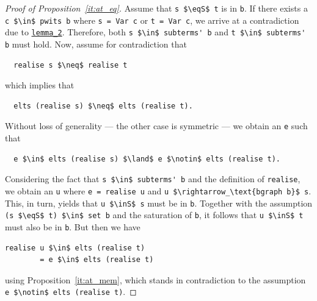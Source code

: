 \documentclass[
  sigplan,
  10pt,
  ]{acmart}
\newcommand{\inS}{\in_\text{s}}
\newcommand{\eqS}{=_\text{s}}
\begin{document}
\begin{proof}[Proof of Proposition~\ref{it:at_eq}]
  Assume that \lstinline!s $\eqS$ t! is in \lstinline!b!.
  If there exists a \lstinline!c $\in$ pwits b! where \lstinline!s = Var c! or \lstinline!t = Var c!, we arrive at a contradiction due to \hyperref[lst:lemma_2]{\lstinline!lemma_2!}.
  Therefore, both \lstinline!s $\in$ subterms' b! and \lstinline!t $\in$ subterms' b! must hold.
  Now, assume for contradiction that
\begin{lstlisting}
  realise s $\neq$ realise t
\end{lstlisting}
  which implies that
\begin{lstlisting}
  elts (realise s) $\neq$ elts (realise t).
\end{lstlisting}
  Without loss of generality --- the other case is symmetric --- we obtain an \lstinline!e! such that
\begin{lstlisting}
  e $\in$ elts (realise s) $\land$ e $\notin$ elts (realise t). 
\end{lstlisting}
  Considering the fact that \lstinline!s $\in$ subterms' b! and the definition of \lstinline!realise!, we obtain an \lstinline!u! where \lstinline!e = realise u! and \lstinline!u $\rightarrow_\text{bgraph b}$ s!.
  This, in turn, yields that \lstinline!u $\inS$ s! must be in \lstinline!b!.
  Together with the assumption \lstinline!(s $\eqS$ t) $\in$ set b! and the saturation of \lstinline!b!, it follows that \lstinline!u $\inS$ t! must also be in \lstinline!b!.
  But then we have
\begin{lstlisting}[columns=fixed]
  realise u $\in$ elts (realise t)
        = e $\in$ elts (realise t)
\end{lstlisting}
  using Proposition~\ref{it:at_mem}, which stands in contradiction to the assumption \lstinline!e $\notin$ elts (realise t)!.
\end{proof}
\end{document}
